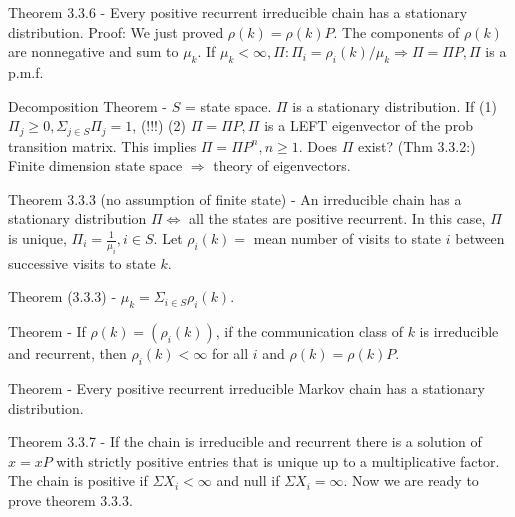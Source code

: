 \documentclass{article}
\begin{document}
Theorem 3.3.6 - Every positive recurrent irreducible chain has a stationary distribution. Proof: We just proved $\rho(k) = \rho(k) P$. The components of $\rho(k)$ are nonnegative and sum to $\mu_k$. If $\mu_k < \infty, \Pi: \Pi_i = \rho_i(k) / \mu_k \Rightarrow \Pi = \Pi P, \Pi$ is a p.m.f.

Decomposition Theorem - $S$ = state space. $\Pi$ is a stationary distribution. If (1) $\Pi_j \ge 0, \Sigma_{j \in S} \Pi_j = 1$, (!!!) (2) $\Pi = \Pi P, \Pi$ is a LEFT eigenvector of the prob transition matrix. This implies $\Pi = \Pi P^n, n \ge 1$. Does $\Pi$ exist? (Thm 3.3.2:) Finite dimension state space $\Rightarrow$ theory of eigenvectors.

Theorem 3.3.3 (no assumption of finite state) - An irreducible chain has a stationary distribution $\Pi \iff$ all the states are positive recurrent. In this case, $\Pi$ is unique, $\Pi_i = \frac{1}{\mu_i}, i \in S$. Let $\rho_i(k) =$ mean number of visits to state $i$ between successive visits to state $k$.

Theorem (3.3.3) - $\mu_k = \Sigma_{i \in S} \rho_i(k)$.

Theorem - If $\rho(k) = (\rho_i(k))$, if the communication class of $k$ is irreducible and recurrent, then $\rho_i(k) < \infty$ for all $i$ and $\rho(k) = \rho(k)P$.

Theorem - Every positive recurrent irreducible Markov chain has a stationary distribution.

Theorem 3.3.7 - If the chain is irreducible and recurrent there is a solution of $x = xP$ with strictly positive entries that is unique up to a multiplicative factor. The chain is positive if $\Sigma X_i < \infty$ and null if $\Sigma X_i = \infty$. Now we are ready to prove theorem 3.3.3.
\end{document}
